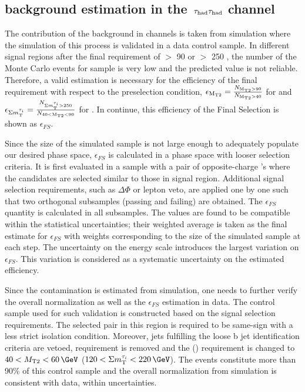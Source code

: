 \subsection{\texorpdfstring{\wjets background estimation in the $\,\tau_{\rm had}\tau_{\rm had}$ channel}{Wjets background estimation in the tau-tau channel}}
\label{sect:bkgW}
The contribution of the \wjets background in \tauTau channels is taken from simulation where the simulation of this process is validated in a data control sample. 
In different signal regions after the final requirement of \mttwo $>$ 90 \GeV or \SumMT $>$ 250 \GeV, the number of the Monte Carlo events for \wjets sample is very low and the 
predicted value is not reliable. 
Therefore, a valid estimation is necessary for the efficiency of the final requirement with respect to the preselection condition, %
$\epsilon_{\rm M_{T2}}=\frac{N_{\rm M_{T2}>90}}{N_{\rm M_{T2}>40}}$ for  \binone and $\epsilon_{\Sigma m_{\rm T}^{\tau_i}}=\frac{N_{\Sigma m_{\rm T}^{\tau_i}>250}}{N_{40<\rm M_{T2}<90}}$ for \bintwo. In continue, this efficiency of the Final Selection is shown as $\epsilon_{FS}$.

Since the size of the simulated \wjets sample is not large enough to adequately populate our desired phase space, %
$\epsilon_{FS}$ is calculated in a phase space with looser selection criteria. It is first evaluated in a \wjets sample with a pair of opposite-charge \Tau's where the \Tau candidates are selected similar to those in signal region. 
Additional signal selection requirements, such as $\Delta \Phi$ or lepton veto, are applied one by one such that two orthogonal subsamples (passing and failing) are obtained. The $\epsilon_{FS}$ quantity is calculated in all subsamples. The values are found to be compatible within the statistical uncertainties; their weighted average is taken as the final estimate for $\epsilon_{FS}$ with weights corresponding to the size of the simulated sample at each step. The uncertainty on the \Tau energy scale introduces the largest variation on $\epsilon_{FS}$. This variation is considered as a systematic uncertainty on the estimated efficiency.

Since the \wjets contamination is estimated from simulation, one needs to further verify the overall normalization as well as the $\epsilon_{FS}$ estimation in data. The control sample used for such validation is constructed based on the \muTau signal selection requirements. The selected \muTau pair in this region is required to be same-sign with a less strict \Tau isolation condition. Moreover, jets fulfilling the loose b jet identification criteria are vetoed, \tauMT requirement is removed and the \mttwo (\SumMT) requirement is changed to $40<\mttwo<60\,\GeV$ ($120<\SumMT<220\,\GeV$). The \wjets events constitute more than 90\% of this control sample and the overall normalization from simulation is consistent with data, within uncertainties.

